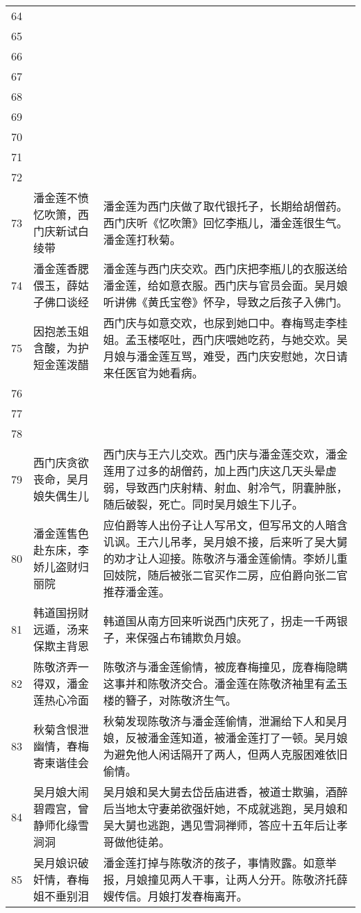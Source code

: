 \begin{longtable}{|c|p{}|p{}|}
64 & & \\
65 & & \\
66 & & \\
67 & & \\
68 & & \\
69 & & \\
70 & & \\
71 & & \\
72 & & \\
73 & 潘金莲不愤忆吹箫，西门庆新试白绫带 & 潘金莲为西门庆做了取代银托子，长期给胡僧药。西门庆听《忆吹箫》回忆李瓶儿，潘金莲很生气。潘金莲打秋菊。 \\
74 & 潘金莲香腮偎玉，薛姑子佛口谈经 & 潘金莲与西门庆交欢。西门庆把李瓶儿的衣服送给潘金莲，给如意衣服。西门庆与官员会面。吴月娘听讲佛《黄氏宝卷》怀孕，导致之后孩子入佛门。 \\
75 & 因抱恙玉姐含酸，为护短金莲泼醋 & 西门庆与如意交欢，也尿到她口中。春梅骂走李桂姐。孟玉楼呕吐，西门庆喂她吃药，与她交欢。吴月娘与潘金莲互骂，难受，西门庆安慰她，次日请来任医官为她看病。 \\
76 & & \\
77 & & \\
78 & & \\
79 & 西门庆贪欲丧命，吴月娘失偶生儿 & 西门庆与王六儿交欢。西门庆与潘金莲交欢，潘金莲用了过多的胡僧药，加上西门庆这几天头晕虚弱，导致西门庆射精、射血、射冷气，阴囊肿胀，随后破裂，死亡。同时吴月娘生下儿子。 \\
80 & 潘金莲售色赴东床，李娇儿盗财归丽院 & 应伯爵等人出份子让人写吊文，但写吊文的人暗含讥讽。王六儿吊孝，吴月娘不接，后来听了吴大舅的劝才让人迎接。陈敬济与潘金莲偷情。李娇儿重回妓院，随后被张二官买作二房，应伯爵向张二官推荐潘金莲。 \\
81 & 韩道国拐财远遁，汤来保欺主背恩 & 韩道国从南方回来听说西门庆死了，拐走一千两银子，来保强占布铺欺负月娘。 \\
82 & 陈敬济弄一得双，潘金莲热心冷面 & 陈敬济与潘金莲偷情，被庞春梅撞见，庞春梅隐瞒这事并和陈敬济交合。潘金莲在陈敬济袖里有孟玉楼的簪子，对陈敬济生气。\\
83 & 秋菊含恨泄幽情，春梅寄柬谐佳会 & 秋菊发现陈敬济与潘金莲偷情，泄漏给下人和吴月娘，反被潘金莲知道，被潘金莲打了一顿。吴月娘为避免他人闲话隔开了两人，但两人克服困难依旧偷情。 \\
84 & 吴月娘大闹碧霞宫，曾静师化缘雪涧洞 & 吴月娘和吴大舅去岱岳庙进香，被道士欺骗，酒醉后当地太守妻弟欲强奸她，不成就逃跑，吴月娘和吴大舅也逃跑，遇见雪洞禅师，答应十五年后让孝哥做他徒弟。 \\
85 & 吴月娘识破奸情，春梅姐不垂别泪 & 潘金莲打掉与陈敬济的孩子，事情败露。如意举报，月娘撞见两人干事，让两人分开。陈敬济托薛嫂传信。月娘打发春梅离开。\\

\end{longtable}
